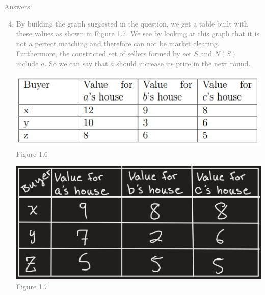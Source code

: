 \documentclass[11pt]{article}
\begin{document}
\textcolor{gray}{
Answers:
\begin{enumerate}
	\setcounter{enumi}{3}
	\item By building the graph suggested in the question, we get a table built with these values as shown in Figure 1.7.  We see by looking at this graph that it is not a perfect matching and therefore can not be market clearing.  Furthermore, the constricted set of sellers formed by set $S$ and $N(S)$ include $a$.  So we can say that $a$ should increase its price in the next round.
	\begin{center}
		\includegraphics[scale=1.5]{Figure1.6}\\
		Figure 1.6
	\end{center}	\begin{center}
		\includegraphics[scale=0.3]{Figure1.7}\\
		Figure 1.7
	\end{center}
\end{enumerate}
}
\end{document}
